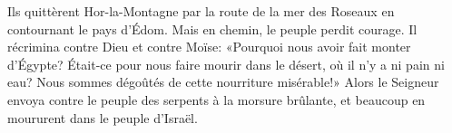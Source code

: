 Ils quittèrent Hor-la-Montagne par la route de la mer des Roseaux
		en contournant le pays d’Édom.
	Mais en chemin, le peuple perdit courage.
Il récrimina contre Dieu et contre Moïse:
	«Pourquoi nous avoir fait monter d’Égypte?
	Était-ce pour nous faire mourir dans le désert, où il n’y a ni pain ni eau?
	Nous sommes dégoûtés de cette nourriture misérable!»
Alors le Seigneur envoya contre le peuple des serpents à la morsure brûlante,
	et beaucoup en moururent dans le peuple d’Israël.

